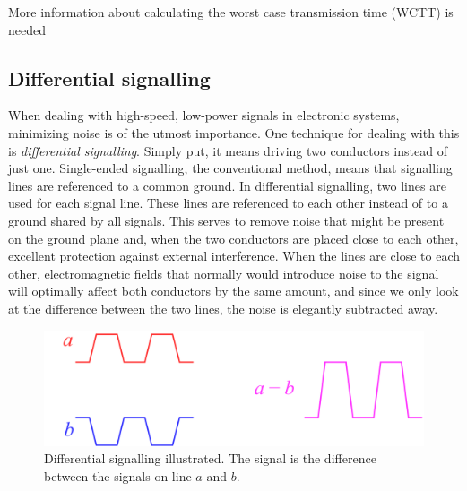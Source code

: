 





{\color{red}More information about calculating the worst case transmission time (WCTT) is needed}


\subsection{Differential signalling}

When dealing with high-speed, low-power signals in electronic systems, minimizing noise is of the utmost importance. One technique for dealing with this is \emph{differential signalling}. Simply put, it means driving two conductors instead of just one. Single-ended signalling, the conventional method, means that signalling lines are referenced to a common ground. In differential signalling, two lines are used for each signal line. These lines are referenced to each other instead of to a ground shared by all signals. This serves to remove noise that might be present on the ground plane and, when the two conductors are placed close to each other, excellent protection against external interference. When the lines are close to each other, electromagnetic fields that normally would introduce noise to the signal will optimally affect both conductors by the same amount, and since we only look at the difference between the two lines, the noise is elegantly subtracted away.

\begin{figure}[H]
    \centering
    \includegraphics[width=.75\textwidth]{media/diffsig.png}
    \caption{Differential signalling illustrated. The signal is the difference between the signals on line $a$ and $b$.}
    \label{fig:diffsig}
\end{figure}

